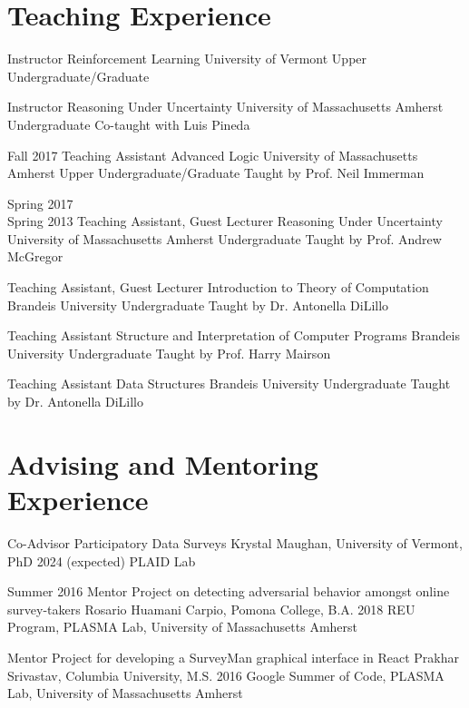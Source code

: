 \documentclass[11pt,a4paper,sans]{moderncv} %
\newcommand{\umass}{University of Massachusetts Amherst}
\newcommand{\uvm}{University of Vermont}
\begin{document}
\section{Teaching Experience}

  {Instructor}
  {Reinforcement Learning}
  {\uvm{}}
  {Upper Undergraduate/Graduate}
  {}

    {Instructor}
    {Reasoning Under Uncertainty}
    {\umass{}}
    {Undergraduate}
    {Co-taught with Luis Pineda}

\cventry
{Fall 2017}
{Teaching Assistant}
    {Advanced Logic}
    {\umass{}}
    {Upper Undergraduate/Graduate}
    {Taught by Prof. Neil Immerman}
    

\cventry
    {Spring 2017\\ Spring 2013}
{Teaching Assistant, Guest Lecturer}
    {Reasoning Under Uncertainty}
    {\umass{}}
    {Undergraduate}
    {Taught by Prof. Andrew McGregor}
    

    {Teaching Assistant, Guest Lecturer}
    {Introduction to Theory of Computation}
    {Brandeis University}
    {Undergraduate}
    {Taught by Dr. Antonella DiLillo}

    {Teaching Assistant}
    {Structure and Interpretation of Computer Programs}
    {Brandeis University}
    {Undergraduate}
    {Taught by Prof. Harry Mairson}
    
    {Teaching Assistant}
    {Data Structures}
    {Brandeis University}
    {Undergraduate}
    {Taught by Dr. Antonella DiLillo}

\section{Advising and Mentoring Experience}
  {Co-Advisor}
  {Participatory Data Surveys}
  {Krystal Maughan, University of Vermont, PhD 2024 (expected)}
  {PLAID Lab}{}
  
    \cventry    
    {Summer 2016}
{Mentor}
    {Project on detecting adversarial behavior amongst online survey-takers}
    {Rosario Huamani Carpio, Pomona College, B.A.  2018}
    {}
    {REU Program, PLASMA Lab, University of Massachusetts Amherst}

{Mentor}
    {Project for developing a SurveyMan graphical interface in React}
    {Prakhar Srivastav, Columbia University, M.S. 2016}
    {}
    {Google Summer of Code, PLASMA Lab, University of Massachusetts Amherst}
    
\end{document}
